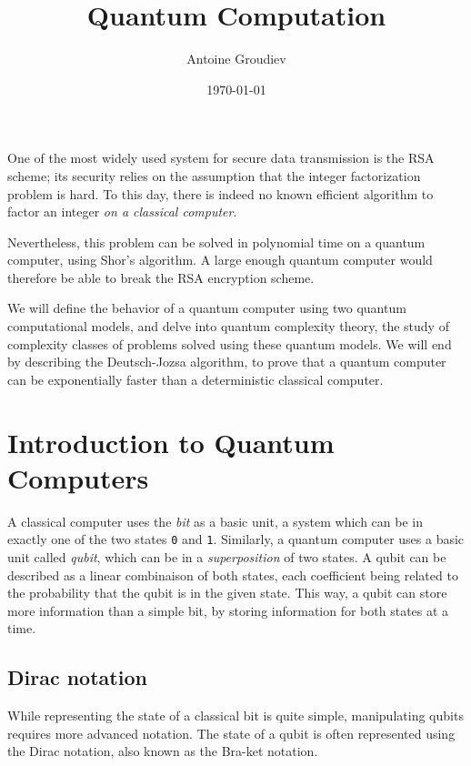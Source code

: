 \documentclass[12pt,a4paper]{article}
\title{\vspace{-5ex} \textbf{Quantum Computation}}
\author{Antoine Groudiev}
\date{\vspace{-1ex}\today}
\theoremstyle{definition}
\begin{document}
\maketitle
One of the most widely used system for secure data transmission is the RSA scheme; its security relies on the assumption that the integer factorization problem is hard. To this day, there is indeed no known efficient algorithm to factor an integer \textit{on a classical computer}.

Nevertheless, this problem can be solved in polynomial time on a quantum computer, using Shor's algorithm. A large enough quantum computer would therefore be able to break the RSA encryption scheme.

We will define the behavior of a quantum computer using two quantum computational models, and delve into quantum complexity theory, the study of complexity classes of problems solved using these quantum models. We will end by describing the Deutsch-Jozsa algorithm, to prove that a quantum computer can be exponentially faster than a deterministic classical computer.

\tableofcontents

\section{Introduction to Quantum Computers}
A classical computer uses the \emph{bit} as a basic unit, a system which can be in exactly one of the two states \texttt{0} and \texttt{1}. Similarly, a quantum computer uses a basic unit called \emph{qubit}, which can be in a \emph{superposition} of two states. A qubit can be described as a linear combinaison of both states, each coefficient being related to the probability that the qubit is in the given state. This way, a qubit can store more information than a simple bit, by storing information for both states at a time.


\subsection{Dirac notation}
While representing the state of a classical bit is quite simple, manipulating qubits requires more advanced notation. 
The state of a qubit is often represented using the Dirac notation, also known as the Bra-ket notation.%
\end{document}

